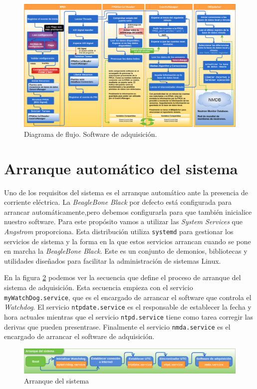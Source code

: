     \begin{figure}
        \centering
        \includegraphics[keepaspectratio, width=1\textwidth]{./img/soft_adquisicion.png}
        \caption{Diagrama de flujo. Software de adquisición.}
        \label{fig:soft_adquisición}
    \end{figure}

    \section{Arranque automático del sistema}
        Uno de los requisitos del sistema es el arranque automático ante la presencia de corriente eléctrica. La \emph{BeagleBone Black} por defecto está
        configurada para arrancar automáticamente,pero debemos configurarla para que también inicialice nuestro software. Para este propósito vamos a
        utilizar las \emph{System Services}\cite{AngSystemctl} que \emph{Angstrom} proporciona. Esta distribución utiliza \texttt{systemd}\cite{systemdWiki}
        para gestionar los servicios de sistema y la forma en la que estos servicios arrancan cuando se pone en marcha la \emph{BeagleBone Black}. Este es un
        conjunto de demonios, bibliotecas y utilidades diseñados para facilitar la administración de sistemas Linux.
        \par
        En la figura \ref{fig:boot} podemos ver la secuencia que define el proceso de arranque del sistema de adquisición. Esta secuencia empieza con
        el servicio \texttt{myWatchDog.service}, que es el encargado de arrancar el software que controla el \emph{Watchdog}. El servicio
        \texttt{ntpdate.service} es el responsable de establecer la fecha y hora actuales mientras que el servicio \texttt{ntpd.service} tiene como
        tarea corregir las derivas que pueden presentrase. Finalmente el servicio \texttt{nmda.service} es el encargado de arrancar el software de
        adquisición.
        \begin{figure}[h]
            \centering
            \includegraphics[keepaspectratio, width=1\textwidth]{./img/boot.png}
            \caption{Arranque del sistema}   
            \label{fig:boot}
        \end{figure}

